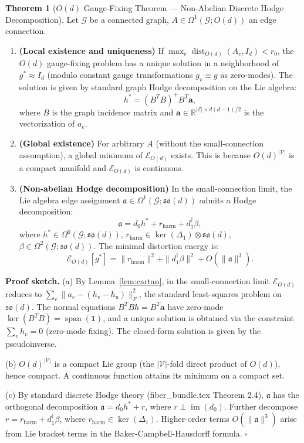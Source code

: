 \documentclass[12pt,a4paper]{article}
\theoremstyle{definition}
\newtheorem{theorem}{Theorem}[section]
\theoremstyle{remark}
\theoremstyle{definition}
\newcommand{\R}{\mathbb{R}}
\newcommand{\Od}{O(d)}
\newcommand{\grph}{\mathcal{G}}
\newcommand{\verts}{\mathcal{V}}
\newcommand{\edgs}{\mathcal{E}}
\newcommand{\doneT}{d_1^\dagger}
\newcommand{\Lone}{\Delta_1}
\DeclareMathOperator{\im}{im}
\DeclareMathOperator{\Span}{span}
\DeclareMathOperator{\dist}{dist}
\begin{document}
\begin{theorem}[$O(d)$ Gauge-Fixing Theorem — Non-Abelian Discrete Hodge Decomposition]\label{thm:od_hodge_fix}
Let $\grph$ be a connected graph, $A \in \Omega^1(\grph; \Od)$ an edge connection.

\begin{enumerate}[label=(\alph*)]
    \item \textbf{(Local existence and uniqueness)}
    If $\max_e \dist_{\Od}(A_e, I_d) < r_0$, the $O(d)$ gauge-fixing problem has a unique solution in a neighborhood of $g^* \approx I_d$
    (modulo constant gauge transformations $g_v \equiv g$ as zero-modes). The solution is given by standard graph Hodge decomposition on the Lie algebra:
    \[
        h^* = (B^T B)^+ B^T \mathbf{a},
    \]
    where $B$ is the graph incidence matrix and $\mathbf{a} \in \R^{|\edgs| \times d(d-1)/2}$ is the vectorization of $a_e$.

    \item \textbf{(Global existence)}
    For arbitrary $A$ (without the small-connection assumption), a global minimum of $\mathcal{E}_{\Od}$ exists.
    This is because $\Od^{|\verts|}$ is a compact manifold and $\mathcal{E}_{\Od}$ is continuous.

    \item \textbf{(Non-abelian Hodge decomposition)}
    In the small-connection limit, the Lie algebra edge assignment $\mathfrak{a} \in \Omega^1(\grph; \mathfrak{so}(d))$ admits a Hodge decomposition:
    \[
        \mathfrak{a} = d_0 h^* + r_{\text{harm}} + \doneT \beta,
    \]
    where $h^* \in \Omega^0(\grph; \mathfrak{so}(d))$, $r_{\text{harm}} \in \ker(\Lone) \otimes \mathfrak{so}(d)$,
    $\beta \in \Omega^2(\grph; \mathfrak{so}(d))$.
    The minimal distortion energy is:
    \[
        \mathcal{E}_{\Od}[g^*] = \|r_{\text{harm}}\|^2 + \|\doneT \beta\|^2 + O(\|\mathfrak{a}\|^3).
    \]
\end{enumerate}

\textbf{Proof sketch.}
(a) By Lemma~\ref{lem:cartan}, in the small-connection limit $\mathcal{E}_{\Od}$ reduces to $\sum_e \|a_e - (h_v - h_u)\|_F^2$,
the standard least-squares problem on $\mathfrak{so}(d)$. The normal equations $B^T B h = B^T \mathbf{a}$ have zero-mode $\ker(B^T B) = \Span(\mathbf{1})$,
and a unique solution is obtained via the constraint $\sum_v h_v = 0$ (zero-mode fixing). The closed-form solution is given by the pseudoinverse.

(b) $\Od^{|\verts|}$ is a compact Lie group (the $|\verts|$-fold direct product of $\Od$), hence compact.
A continuous function attains its minimum on a compact set.

(c) By standard discrete Hodge theory (fiber\_bundle.tex Theorem 2.4), $\mathfrak{a}$ has the orthogonal decomposition
$\mathfrak{a} = d_0 h^* + r$, where $r \perp \im(d_0)$.
Further decompose $r = r_{\text{harm}} + \doneT \beta$, where $r_{\text{harm}} \in \ker(\Lone)$.
Higher-order terms $O(\|\mathfrak{a}\|^3)$ arise from Lie bracket terms in the Baker-Campbell-Hausdorff formula. $\square$
\end{theorem}
\end{document}
